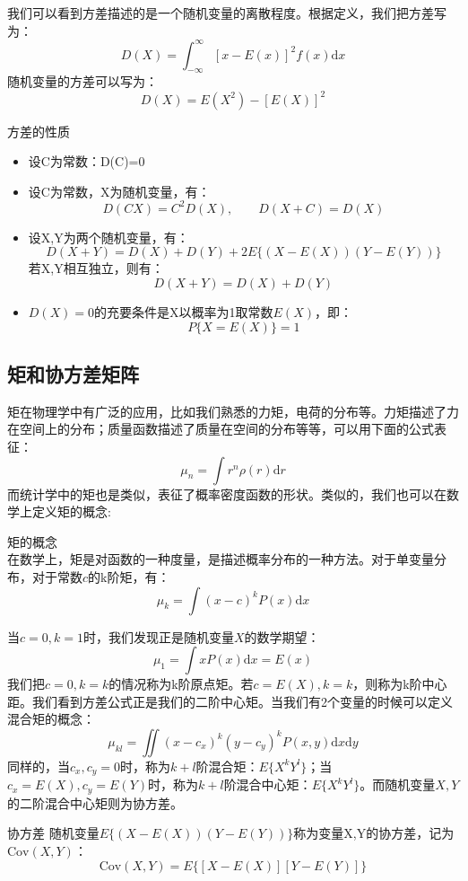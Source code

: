 \setlength{\parindent}{2em}我们可以看到方差描述的是一个随机变量的离散程度。根据定义，我们把方差写为：
\begin{equation}
    D(X)=\int^{\infty}_{-\infty} [x-E(x)]^2 f(x) \mathrm{d} x
\end{equation}
随机变量的方差可以写为：
\begin{equation}
    D(X)=E(X^2)-[E(X)]^2
\end{equation}

\begin{prop}{方差的性质}
    \begin{itemize}
        \item 设C为常数：D(C)=0
        \item 设C为常数，X为随机变量，有：$$D(CX)=C^2D(X),\qquad D(X+C)=D(X)$$
        \item 设X,Y为两个随机变量，有：$$D(X+Y)=D(X)+D(Y)+2E\{ (X-E(X))(Y-E(Y)) \}$$ 若X,Y相互独立，则有：$$ D(X+Y)=D(X)+D(Y) $$
        \item $D(X)=0$的充要条件是X以概率为1取常数$E(X)$，即：$$ P\{ X=E(X) \}=1 $$
    \end{itemize}
\end{prop}

\subsection{矩和协方差矩阵}
矩在物理学中有广泛的应用，比如我们熟悉的力矩，电荷的分布等。力矩描述了力在空间上的分布；质量函数描述了质量在空间的分布等等，可以用下面的公式表征：
$$
\mu_n = \int r^n \rho(r)\mathrm{d} r
$$
而统计学中的矩也是类似，表征了概率密度函数的形状。类似的，我们也可以在数学上定义矩的概念:
\begin{definition}{矩的概念\\}
    在数学上，矩是对函数的一种度量，是描述概率分布的一种方法。对于单变量分布，对于常数$c$的k阶矩，有：
    \begin{equation}
        \mu_k=\int (x-c)^k P(x)\mathrm{d}x
    \end{equation}
\end{definition}
当$c=0,k=1$时，我们发现正是随机变量$X$的数学期望：
$$ \mu_1=\int xP(x)\mathrm{d}x = E(x) $$我们把$c=0,k=k$的情况称为k阶原点矩。若$c=E(X),k=k$，则称为k阶中心距。我们看到方差公式正是我们的二阶中心矩。当我们有2个变量的时候可以定义混合矩的概念：
$$\mu_{kl}=\iint (x-c_x)^k (y-c_y)^k P(x,y)\mathrm{d}x\mathrm{d}y$$
同样的，当$c_x,c_y=0$时，称为$k+l$阶混合矩：$E\{X^kY^l\}$；当$c_x=E(X),c_y=E(Y)$时，称为$k+l$阶混合中心矩：$E\{X^kY^l\}$。而随机变量$X,Y$的二阶混合中心矩则为协方差。
\begin{definition}{协方差}
    随机变量$E\{ (X-E(X))(Y-E(Y)) \}$称为变量X,Y的协方差，记为$\mathrm{Cov}(X,Y)$：
    \begin{equation}
        \mathrm{Cov}(X,Y)=E\{[X-E(X)][Y-E(Y)]\}
    \end{equation}
\end{definition}

